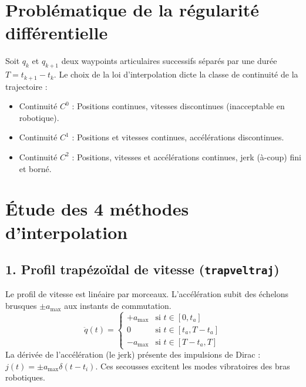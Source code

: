 \documentclass[11pt,a4paper]{report}
\begin{document}
\section{Problématique de la régularité différentielle}
Soit $q_k$ et $q_{k+1}$ deux waypoints articulaires successifs séparés par une durée $T = t_{k+1} - t_k$. Le choix de la loi d'interpolation dicte la classe de continuité de la trajectoire :
\begin{itemize}
    \item Continuité $C^0$ : Positions continues, vitesses discontinues (inacceptable en robotique).
    \item Continuité $C^1$ : Positions et vitesses continues, accélérations discontinues.
    \item Continuité $C^2$ : Positions, vitesses et accélérations continues, jerk (à-coup) fini et borné.
\end{itemize}

\section{Étude des 4 méthodes d'interpolation}

\subsection{1. Profil trapézoïdal de vitesse (\texttt{trapveltraj})}
Le profil de vitesse est linéaire par morceaux. L'accélération subit des échelons brusques $\pm a_{\max}$ aux instants de commutation.
\begin{equation}
    \ddot{q}(t) = 
    \begin{cases}
        +a_{\max} & \text{si } t \in [0, t_a] \\
        0 & \text{si } t \in [t_a, T - t_a] \\
        -a_{\max} & \text{si } t \in [T - t_a, T]
    \end{cases}
\end{equation}
La dérivée de l'accélération (le jerk) présente des impulsions de Dirac : $j(t) = \pm a_{\max} \delta(t - t_i)$. Ces secousses excitent les modes vibratoires des bras robotiques.
\end{document}
